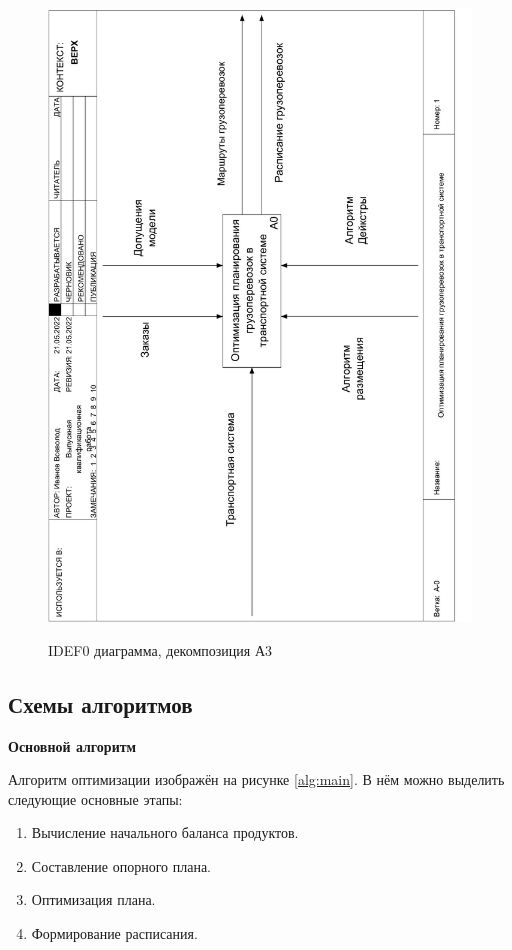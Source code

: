 \pagebreak
\begin{figure}[h]
	\begin{center}
		{\includegraphics[scale=0.63, angle=-90, page=6]{img/idef0.pdf}}
		\caption{IDEF0 диаграмма, декомпозиция А3}
		\label{idef0:A3}
	\end{center}
\end{figure}

\subsection{Схемы алгоритмов}

\textbf{Основной алгоритм}

Алгоритм оптимизации изображён на рисунке \ref{alg:main}. В нём можно выделить следующие основные этапы:
\begin{enumerate}
	\item Вычисление начального баланса продуктов.
	\item Составление опорного плана.
	\item Оптимизация плана.
	\item Формирование расписания.
\end{enumerate}

